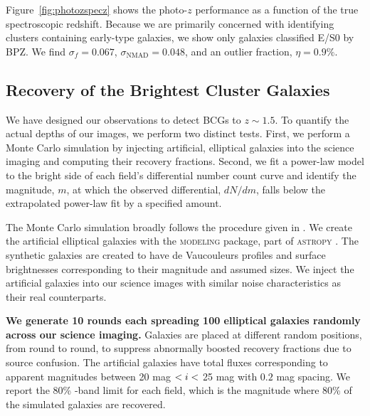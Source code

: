 \documentclass[apj, revtex4-1]{emulateapj}
\begin{document}
Figure~\ref{fig:photozspecz} shows the photo-$z$ performance as a function of the true spectroscopic redshift. Because we are primarily concerned with identifying clusters containing early-type galaxies, we show only galaxies classified E/S0 by BPZ. We find $\sigma_f = 0.067$, $\sigma_\mathrm{NMAD} = 0.048$, and an outlier fraction, $\eta = 0.9\%$.

\subsection{Recovery of the Brightest Cluster Galaxies}
We have designed our observations to detect BCGs to $z\sim1.5$. To quantify the actual depths of our images, we perform two distinct tests. First, we perform a Monte Carlo simulation by injecting artificial, elliptical galaxies into the science imaging and computing their recovery fractions. Second, we fit a power-law model to the bright side of each field's differential number count curve and identify the magnitude, $m$, at which  the observed differential, $dN/dm$, falls below the extrapolated power-law fit by a specified amount.

The Monte Carlo simulation broadly follows the procedure given in \cite{Menanteau2010a}. We create the artificial elliptical galaxies with the \textsc{modeling} package, part of \textsc{astropy} \citep{TheAstropyCollaboration2013}. The synthetic galaxies are created to have de Vaucouleurs \citep{DeVaucouleurs1948} profiles and surface brightnesses corresponding to their magnitude and assumed sizes. We inject the artificial galaxies into our science images with similar noise characteristics as their real counterparts.

\textbf{We generate 10 rounds each spreading 100 elliptical galaxies randomly across our science imaging.} Galaxies are placed at different random positions, from round to round, to suppress abnormally boosted recovery fractions due to source confusion. The artificial galaxies have total fluxes corresponding to apparent magnitudes between 20 mag $< \hbox{$i$} <$ 25 mag with $0.2$ mag spacing. We report the 80\% \sdssi-band limit for each field, which is the magnitude where 80\% of the simulated galaxies are recovered.
\end{document}
